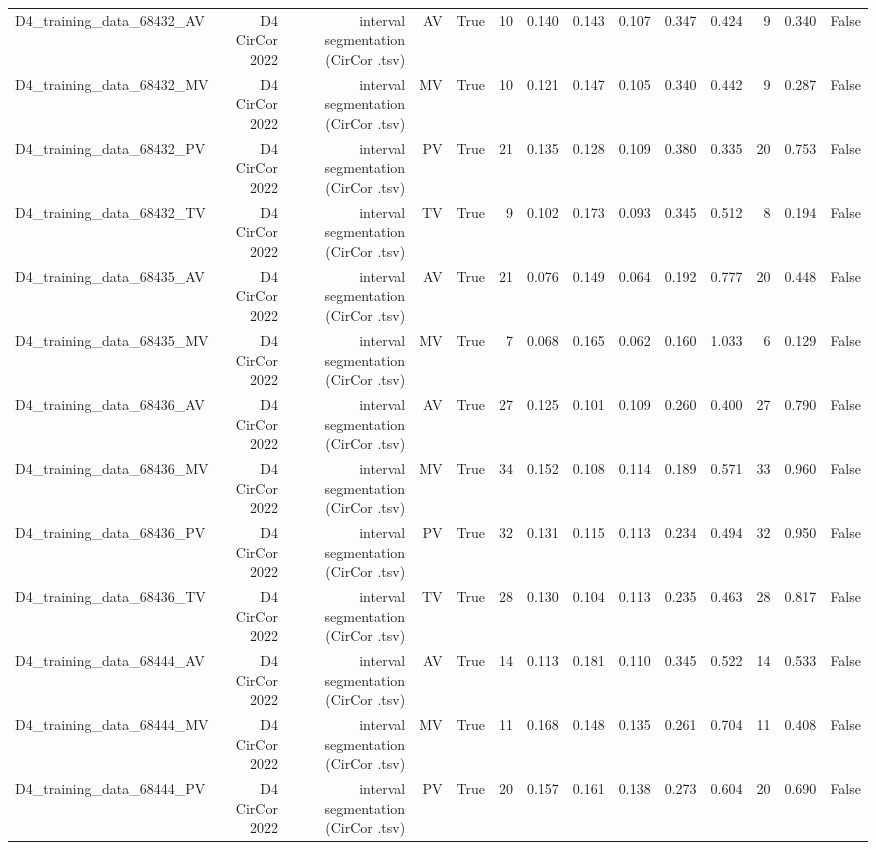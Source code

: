\begin{table}[htbp]
\begin{tabular}{lrrrrrrrrrrrrr}
    D4\_training\_data\_68432\_AV & D4 CirCor 2022 & interval segmentation (CirCor .tsv) & AV & True & 10 & 0.140 & 0.143 & 0.107 & 0.347 & 0.424 & 9 & 0.340 & False \\
    D4\_training\_data\_68432\_MV & D4 CirCor 2022 & interval segmentation (CirCor .tsv) & MV & True & 10 & 0.121 & 0.147 & 0.105 & 0.340 & 0.442 & 9 & 0.287 & False \\
    D4\_training\_data\_68432\_PV & D4 CirCor 2022 & interval segmentation (CirCor .tsv) & PV & True & 21 & 0.135 & 0.128 & 0.109 & 0.380 & 0.335 & 20 & 0.753 & False \\
    D4\_training\_data\_68432\_TV & D4 CirCor 2022 & interval segmentation (CirCor .tsv) & TV & True & 9 & 0.102 & 0.173 & 0.093 & 0.345 & 0.512 & 8 & 0.194 & False \\
    D4\_training\_data\_68435\_AV & D4 CirCor 2022 & interval segmentation (CirCor .tsv) & AV & True & 21 & 0.076 & 0.149 & 0.064 & 0.192 & 0.777 & 20 & 0.448 & False \\
    D4\_training\_data\_68435\_MV & D4 CirCor 2022 & interval segmentation (CirCor .tsv) & MV & True & 7 & 0.068 & 0.165 & 0.062 & 0.160 & 1.033 & 6 & 0.129 & False \\
    D4\_training\_data\_68436\_AV & D4 CirCor 2022 & interval segmentation (CirCor .tsv) & AV & True & 27 & 0.125 & 0.101 & 0.109 & 0.260 & 0.400 & 27 & 0.790 & False \\
    D4\_training\_data\_68436\_MV & D4 CirCor 2022 & interval segmentation (CirCor .tsv) & MV & True & 34 & 0.152 & 0.108 & 0.114 & 0.189 & 0.571 & 33 & 0.960 & False \\
    D4\_training\_data\_68436\_PV & D4 CirCor 2022 & interval segmentation (CirCor .tsv) & PV & True & 32 & 0.131 & 0.115 & 0.113 & 0.234 & 0.494 & 32 & 0.950 & False \\
    D4\_training\_data\_68436\_TV & D4 CirCor 2022 & interval segmentation (CirCor .tsv) & TV & True & 28 & 0.130 & 0.104 & 0.113 & 0.235 & 0.463 & 28 & 0.817 & False \\
    D4\_training\_data\_68444\_AV & D4 CirCor 2022 & interval segmentation (CirCor .tsv) & AV & True & 14 & 0.113 & 0.181 & 0.110 & 0.345 & 0.522 & 14 & 0.533 & False \\
    D4\_training\_data\_68444\_MV & D4 CirCor 2022 & interval segmentation (CirCor .tsv) & MV & True & 11 & 0.168 & 0.148 & 0.135 & 0.261 & 0.704 & 11 & 0.408 & False \\
    D4\_training\_data\_68444\_PV & D4 CirCor 2022 & interval segmentation (CirCor .tsv) & PV & True & 20 & 0.157 & 0.161 & 0.138 & 0.273 & 0.604 & 20 & 0.690 & False \\

\end{tabular}
\end{table}
